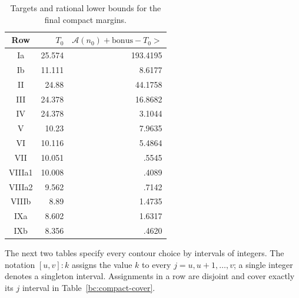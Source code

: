 \documentclass[11pt,reqno]{amsart}
\numberwithin{equation}{section}
\theoremstyle{definition}
\theoremstyle{remark}
\begin{document}
\begin{table}[ht]
\centering\small
\caption{Targets and rational lower bounds for the final compact margins.}
\label{bc:compact-margins}
\begin{tabular}{@{}crr@{}}\toprule
Row&$T_0$&$\mathcal A(n_0)+\mathrm{bonus}-T_0>$\\\midrule
Ia & 25.574 & 193.4195\\
Ib & 11.111 & 8.6177\\
II & 24.88 & 44.1758\\
III & 24.378 & 16.8682\\
IV & 24.378 & 3.1044\\
V & 10.23 & 7.9635\\
VI & 10.116 & 5.4864\\
VII & 10.051 & .5545\\
VIIIa1 & 10.008 & .4089\\
VIIIa2 & 9.562 & .7142\\
VIIIb & 8.89 & 1.4735\\
IXa & 8.602 & 1.6317\\
IXb & 8.356 & .4620\\
\bottomrule\end{tabular}
\end{table}

The next two tables specify every contour choice by intervals of
integers.  The notation $[u,v]:k$ assigns the value $k$ to every
$j=u,u+1,\ldots,v$; a single integer denotes a singleton interval.
Assignments in a row are disjoint and cover exactly its $j$ interval
in Table~\ref{bc:compact-cover}.
\end{document}
